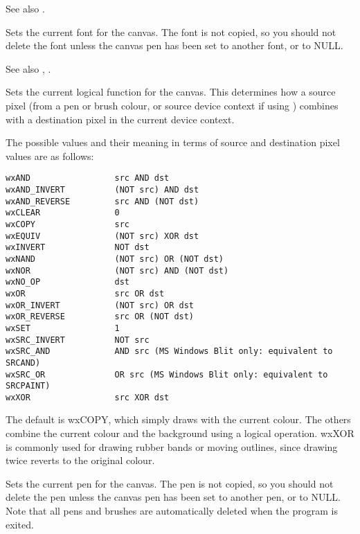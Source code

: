 See also .



Sets the current font for the canvas. The font is not copied, so you
should not delete the font unless the canvas pen has been set to
another font, or to NULL.

See also , .



Sets the current logical function for the canvas.  This determines how
a source pixel (from a pen or brush colour, or source device context if using )
combines with a destination pixel in the current device context.

The possible values
and their meaning in terms of source and destination pixel values are
as follows:

\begin{verbatim}
wxAND                 src AND dst
wxAND_INVERT          (NOT src) AND dst
wxAND_REVERSE         src AND (NOT dst)
wxCLEAR               0
wxCOPY                src
wxEQUIV               (NOT src) XOR dst
wxINVERT              NOT dst
wxNAND                (NOT src) OR (NOT dst)
wxNOR                 (NOT src) AND (NOT dst)
wxNO_OP               dst
wxOR                  src OR dst
wxOR_INVERT           (NOT src) OR dst
wxOR_REVERSE          src OR (NOT dst)
wxSET                 1
wxSRC_INVERT          NOT src
wxSRC_AND             AND src (MS Windows Blit only: equivalent to SRCAND)
wxSRC_OR              OR src (MS Windows Blit only: equivalent to SRCPAINT)
wxXOR                 src XOR dst
\end{verbatim}

The default is wxCOPY, which simply draws with the current colour.
The others combine the current colour and the background using a
logical operation.  wxXOR is commonly used for drawing rubber bands or
moving outlines, since drawing twice reverts to the original colour.

\label{wxcanvassetpen}


Sets the current pen for the canvas.  The pen is not copied, so you
should not delete the pen unless the canvas pen has been set to
another pen, or to NULL. Note that all pens and brushes are
automatically deleted when the program is exited.

